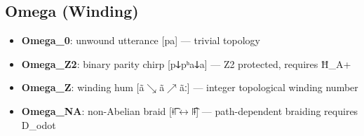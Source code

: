 \documentclass[12pt,a4paper]{article}
\begin{document}
\subsection{Omega (Winding)}

\begin{itemize}
    \item \textbf{Omega\_0}: unwound utterance {[}pa{]} --- trivial topology
    \item \textbf{Omega\_Z2}: binary parity chirp {[}pↆpʰaↆa{]} --- Z2 protected, requires Ħ_A+
    \item \textbf{Omega\_Z}: winding hum {[}ã$\searrow$ã$\nearrow$ãː{]} --- integer topological winding number
    \item \textbf{Omega\_NA}: non-Abelian braid {[}ǂ͡ǀ$\leftrightarrow$ǀ͡ǂ{]} --- path-dependent braiding requires D\_odot
\end{itemize}
\end{document}
